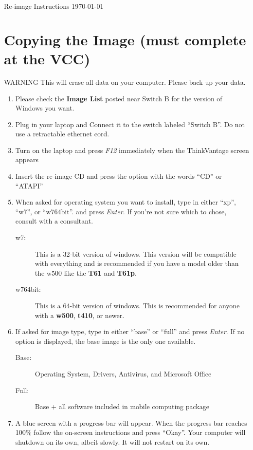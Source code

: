 \documentclass[10pt]{article}
\begin{document}
\begin{flushright}
Re-image Instructions \today
\end{flushright}
\section{Copying the Image (must complete at the VCC)}
{\sc WARNING This will erase all data on your computer. Please back up your data.}
\begin{enumerate}
\item Please check the {\bf Image List} posted near Switch B for the version of Windows you want.
\item Plug in your laptop and Connect it to the switch labeled ``Switch B''. Do not use a retractable ethernet cord.
\item Turn on the laptop and press \emph{F12} immediately when the ThinkVantage screen appears
\item Insert the re-image CD and press the option with the words ``CD'' or ``ATAPI''
\item When asked for operating system you want to install, type in either ``xp'', ``w7'', or ``w764bit''. and press \emph{Enter}. If you're not sure which to chose, consult with a consultant.
\begin{description}
\item[w7:] This is a 32-bit version of windows. This version will be compatible with everything and is recommended if you have a model older than the w500 like the {\bf T61} and {\bf T61p}.
\item[w764bit:] This is a 64-bit version of windows. This is recommended for anyone with a {\bf w500}, {\bf t410}, or newer.
\end{description}
\item If asked for image type, type in either ``base'' or ``full'' and press \emph{Enter}. If no option is displayed, the base image is the only one available.
\begin{description}
\item[Base:] Operating System, Drivers, Antivirus, and Microsoft Office
\item[Full:] Base + all software included in mobile computing package
\end{description}
\item A blue screen with a progress bar will appear. When the progress bar reaches 100\% follow the on-screen instructions and press ``Okay''. Your computer will shutdown on its own, albeit slowly. It will not restart on its own.

\end{enumerate}
\end{document}
